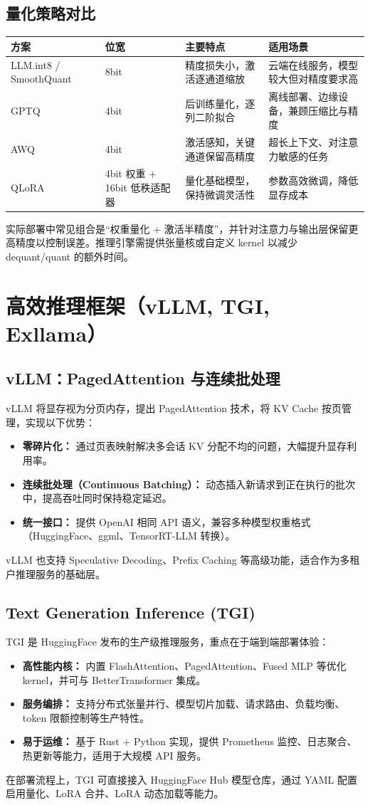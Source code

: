 \documentclass[UTF8,zihao=-4]{ctexart}
\begin{document}
\subsection{量化策略对比}
\begin{longtable}{p{3cm}p{3cm}p{4cm}p{4cm}}
\toprule
方案 & 位宽 & 主要特点 & 适用场景 \\
\midrule
LLM.int8 / SmoothQuant & 8bit & 精度损失小，激活逐通道缩放 & 云端在线服务，模型较大但对精度要求高 \\
GPTQ & 4bit & 后训练量化，逐列二阶拟合 & 离线部署、边缘设备，兼顾压缩比与精度 \\
AWQ & 4bit & 激活感知，关键通道保留高精度 & 超长上下文、对注意力敏感的任务 \\
QLoRA & 4bit 权重 + 16bit 低秩适配器 & 量化基础模型，保持微调灵活性 & 参数高效微调，降低显存成本 \\
\bottomrule
\end{longtable}
实际部署中常见组合是“权重量化 + 激活半精度”，并针对注意力与输出层保留更高精度以控制误差。推理引擎需提供张量核或自定义 kernel 以减少 dequant/quant 的额外时间。

\section{高效推理框架（vLLM, TGI, Exllama）}
\subsection{vLLM：PagedAttention 与连续批处理}
vLLM 将显存视为分页内存，提出 PagedAttention 技术，将 KV Cache 按页管理，实现以下优势：
\begin{itemize}
  \item \textbf{零碎片化：} 通过页表映射解决多会话 KV 分配不均的问题，大幅提升显存利用率。
  \item \textbf{连续批处理（Continuous Batching）：} 动态插入新请求到正在执行的批次中，提高吞吐同时保持稳定延迟。
  \item \textbf{统一接口：} 提供 OpenAI 相同 API 语义，兼容多种模型权重格式（HuggingFace、ggml、TensorRT-LLM 转换）。
\end{itemize}
vLLM 也支持 Speculative Decoding、Prefix Caching 等高级功能，适合作为多租户推理服务的基础层。

\subsection{Text Generation Inference (TGI)}
TGI 是 HuggingFace 发布的生产级推理服务，重点在于端到端部署体验：
\begin{itemize}
  \item \textbf{高性能内核：} 内置 FlashAttention、PagedAttention、Fused MLP 等优化 kernel，并可与 BetterTransformer 集成。
  \item \textbf{服务编排：} 支持分布式张量并行、模型切片加载、请求路由、负载均衡、token 限额控制等生产特性。
  \item \textbf{易于运维：} 基于 Rust + Python 实现，提供 Prometheus 监控、日志聚合、热更新等能力，适用于大规模 API 服务。
\end{itemize}
在部署流程上，TGI 可直接接入 HuggingFace Hub 模型仓库，通过 YAML 配置启用量化、LoRA 合并、LoRA 动态加载等能力。
\end{document}
